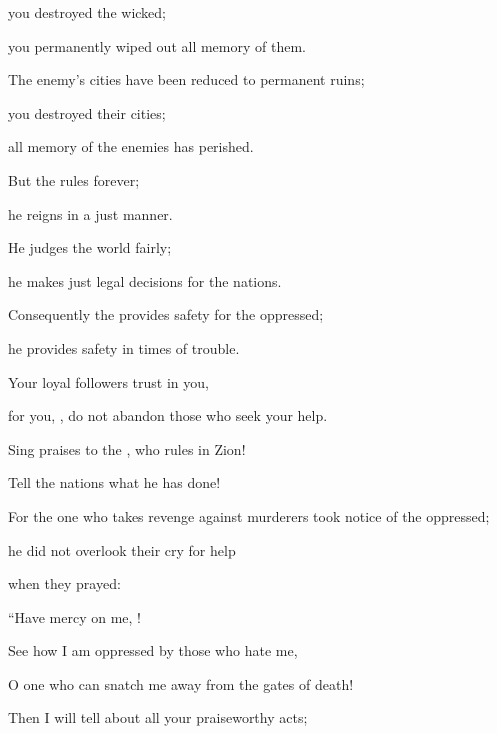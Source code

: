 {\par }{\Q you destroyed
the wicked;
\par }{\Q you permanently
wiped out
all memory of them.
\par }{\Q {}The enemy’s
cities have been reduced
to permanent
ruins;
\par }{\Q you destroyed
their cities;
\par }{\Q all memory
of the enemies
has perished.
\par }{\Q {}But the
{}
rules forever;
\par }{\Q he reigns
in
a just manner.
\par }{\Q {}He judges
the world
fairly;
\par }{\Q he
makes just legal
decisions
for the nations.
\par }{\Q {}Consequently
the {}
provides
safety
for the oppressed;

\par }{\Q he provides
safety in times
of trouble.
\par }{\Q {}Your loyal followers trust
in you,
\par }{\Q for
you,
{}, do not
abandon
those who seek your help.
\par }{\Q {}Sing praises
to the
{}, who rules
in Zion!
\par }{\Q Tell
the nations
what he has done!
\par }{\Q {}For
the one
who takes revenge
against murderers
took notice
of the oppressed;
\par }{\Q he did not
overlook
their cry for help
\par }{\Q {}when they prayed:

\par }{\Q “Have mercy
on me,
{}!
\par }{\Q See
how I am oppressed
by those who hate
me,

\par }{\Q O one who can snatch
me away
from the gates
of death!
\par }{\Q {}Then
I will
tell
about all
your praiseworthy
acts;

}
